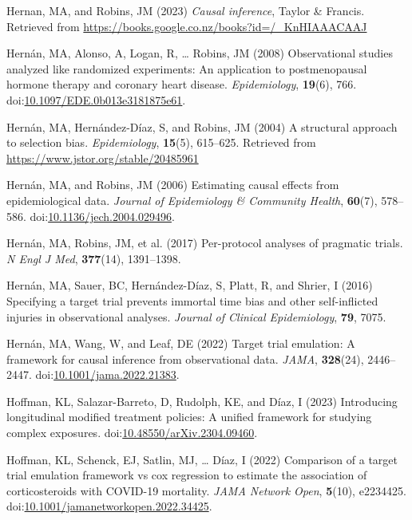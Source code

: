 \documentclass[
  singlecolumn]{article}
\newlength{\cslhangindent}
\newenvironment{CSLReferences}[2] %
 {\begin{list}{}{%
  \setlength{\itemindent}{0pt}
  \setlength{\leftmargin}{0pt}
  \setlength{\parsep}{0pt}
  \ifodd #1
   \setlength{\leftmargin}{\cslhangindent}
   \setlength{\itemindent}{-1\cslhangindent}
  \fi
  \setlength{\itemsep}{#2\baselineskip}}}
 {\end{list}}
\begin{document}
\begin{CSLReferences}{1}{0}
Hernan, MA, and Robins, JM (2023) \emph{Causal inference}, Taylor \&
Francis. Retrieved from
\url{https://books.google.co.nz/books?id=/_KnHIAAACAAJ}

Hernán, MA, Alonso, A, Logan, R, \ldots{} Robins, JM (2008)
Observational studies analyzed like randomized experiments: An
application to postmenopausal hormone therapy and coronary heart
disease. \emph{Epidemiology}, \textbf{19}(6), 766.
doi:\href{https://doi.org/10.1097/EDE.0b013e3181875e61}{10.1097/EDE.0b013e3181875e61}.

Hernán, MA, Hernández-Díaz, S, and Robins, JM (2004) A structural
approach to selection bias. \emph{Epidemiology}, \textbf{15}(5),
615--625. Retrieved from \url{https://www.jstor.org/stable/20485961}

Hernán, MA, and Robins, JM (2006) Estimating causal effects from
epidemiological data. \emph{Journal of Epidemiology \& Community
Health}, \textbf{60}(7), 578--586.
doi:\href{https://doi.org/10.1136/jech.2004.029496}{10.1136/jech.2004.029496}.

Hernán, MA, Robins, JM, et al. (2017) Per-protocol analyses of pragmatic
trials. \emph{N Engl J Med}, \textbf{377}(14), 1391--1398.

Hernán, MA, Sauer, BC, Hernández-Díaz, S, Platt, R, and Shrier, I (2016)
Specifying a target trial prevents immortal time bias and other
self-inflicted injuries in observational analyses. \emph{Journal of
Clinical Epidemiology}, \textbf{79}, 7075.

Hernán, MA, Wang, W, and Leaf, DE (2022) Target trial emulation: A
framework for causal inference from observational data. \emph{JAMA},
\textbf{328}(24), 2446--2447.
doi:\href{https://doi.org/10.1001/jama.2022.21383}{10.1001/jama.2022.21383}.

Hoffman, KL, Salazar-Barreto, D, Rudolph, KE, and Díaz, I (2023)
Introducing longitudinal modified treatment policies: A unified
framework for studying complex exposures.
doi:\href{https://doi.org/10.48550/arXiv.2304.09460}{10.48550/arXiv.2304.09460}.

Hoffman, KL, Schenck, EJ, Satlin, MJ, \ldots{} Díaz, I (2022) Comparison
of a target trial emulation framework vs cox regression to estimate the
association of corticosteroids with COVID-19 mortality. \emph{JAMA
Network Open}, \textbf{5}(10), e2234425.
doi:\href{https://doi.org/10.1001/jamanetworkopen.2022.34425}{10.1001/jamanetworkopen.2022.34425}.


\end{CSLReferences}
\end{document}
